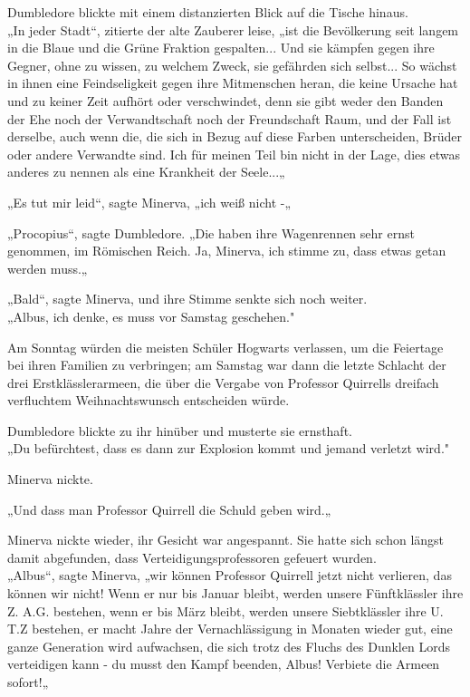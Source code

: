 {Dumbledore blickte mit einem distanzierten Blick auf die Tische hinaus.\\ „In jeder Stadt“, zitierte der alte Zauberer leise, „ist die Bevölkerung seit langem in die Blaue und die Grüne Fraktion gespalten... Und sie kämpfen gegen ihre Gegner, ohne zu wissen, zu welchem Zweck, sie gefährden sich selbst... So wächst in ihnen eine Feindseligkeit gegen ihre Mitmenschen heran, die keine Ursache hat und zu keiner Zeit aufhört oder verschwindet, denn sie gibt weder den Banden der Ehe noch der Verwandtschaft noch der Freundschaft Raum, und der Fall ist derselbe, auch wenn die, die sich in Bezug auf diese Farben unterscheiden, Brüder oder andere Verwandte sind. Ich für meinen Teil bin nicht in der Lage, dies etwas anderes zu nennen als eine Krankheit der Seele...„

„Es tut mir leid“, sagte Minerva, „ich weiß nicht -„

„Procopius“, sagte Dumbledore. „Die haben ihre Wagenrennen sehr ernst genommen, im Römischen Reich. Ja, Minerva, ich stimme zu, dass etwas getan werden muss.„

„Bald“, sagte Minerva, und ihre Stimme senkte sich noch weiter.\\ „Albus, ich denke, es muss vor Samstag geschehen."

Am Sonntag würden die meisten Schüler Hogwarts verlassen, um die Feiertage bei ihren Familien zu verbringen; am Samstag war dann die letzte Schlacht der drei Erstklässlerarmeen, die über die Vergabe von Professor Quirrells dreifach verfluchtem Weihnachtswunsch entscheiden würde.

Dumbledore blickte zu ihr hinüber und musterte sie ernsthaft.\\ „Du befürchtest, dass es dann zur Explosion kommt und jemand verletzt wird."

Minerva nickte.

„Und dass man Professor Quirrell die Schuld geben wird.„

Minerva nickte wieder, ihr Gesicht war angespannt. Sie hatte sich schon längst damit abgefunden, dass Verteidigungsprofessoren gefeuert wurden.\\ „Albus“, sagte Minerva, „wir können Professor Quirrell jetzt nicht verlieren, das können wir nicht! Wenn er nur bis Januar bleibt, werden unsere Fünftklässler ihre Z. A.G. bestehen, wenn er bis März bleibt, werden unsere Siebtklässler ihre U. T.Z bestehen, er macht Jahre der Vernachlässigung in Monaten wieder gut, eine ganze Generation wird aufwachsen, die sich trotz des Fluchs des Dunklen Lords verteidigen kann - du musst den Kampf beenden, Albus! Verbiete die Armeen sofort!„

}
